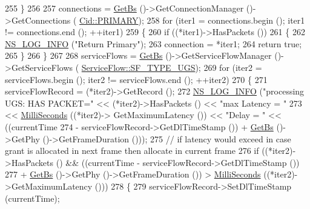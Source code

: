 \begin{DoxyCode}
255         \}
256 
257       connections = \hyperlink{classns3_1_1BSScheduler_a8b09065ac8f74cb35446af55128e41c7}{GetBs} ()->GetConnectionManager ()->GetConnections (
      \hyperlink{classns3_1_1Cid_a10b8f92080ca5790e65a0bfa2f557e0aa0ffb28b79686aa37c614c868e330418b}{Cid::PRIMARY});
258       \textcolor{keywordflow}{for} (iter1 = connections.begin (); iter1 != connections.end (); ++iter1)
259         \{
260           \textcolor{keywordflow}{if} ((*iter1)->HasPackets ())
261             \{
262               \hyperlink{group__logging_gafbd73ee2cf9f26b319f49086d8e860fb}{NS\_LOG\_INFO} (\textcolor{stringliteral}{"Return Primary"});
263               connection = *iter1;
264               \textcolor{keywordflow}{return} \textcolor{keyword}{true};
265             \}
266         \}
267 
268       serviceFlows = \hyperlink{classns3_1_1BSScheduler_a8b09065ac8f74cb35446af55128e41c7}{GetBs} ()->GetServiceFlowManager ()->GetServiceFlows (
      \hyperlink{classns3_1_1ServiceFlow_a7990ba10be1e098328fd1e6382a26235a969e0b62fa12fef1dbb23913744ed594}{ServiceFlow::SF\_TYPE\_UGS});
269       \textcolor{keywordflow}{for} (iter2 = serviceFlows.begin (); iter2 != serviceFlows.end (); ++iter2)
270         \{
271           serviceFlowRecord = (*iter2)->GetRecord ();
272           \hyperlink{group__logging_gafbd73ee2cf9f26b319f49086d8e860fb}{NS\_LOG\_INFO} (\textcolor{stringliteral}{"processing UGS: HAS PACKET="} << (*iter2)->HasPackets () << \textcolor{stringliteral}{"max Latency
       = "}
273                                                      << \hyperlink{group__timecivil_gaf26127cf4571146b83a92ee18679c7a9}{MilliSeconds} ((*iter2)->
      GetMaximumLatency ()) << \textcolor{stringliteral}{"Delay = "} << ((currentTime
274                                                                                            - 
      serviceFlowRecord->GetDlTimeStamp ()) + \hyperlink{classns3_1_1BSScheduler_a8b09065ac8f74cb35446af55128e41c7}{GetBs} ()->GetPhy ()->GetFrameDuration ()));
275           \textcolor{comment}{// if latency would exceed in case grant is allocated in next frame then allocate in current
       frame}
276           \textcolor{keywordflow}{if} ((*iter2)->HasPackets () && ((currentTime - serviceFlowRecord->GetDlTimeStamp ())
277                                           + \hyperlink{classns3_1_1BSScheduler_a8b09065ac8f74cb35446af55128e41c7}{GetBs} ()->GetPhy ()->GetFrameDuration ()) > 
      \hyperlink{group__timecivil_gaf26127cf4571146b83a92ee18679c7a9}{MilliSeconds} ((*iter2)->GetMaximumLatency ()))
278             \{
279               serviceFlowRecord->SetDlTimeStamp (currentTime);

\end{DoxyCode}
